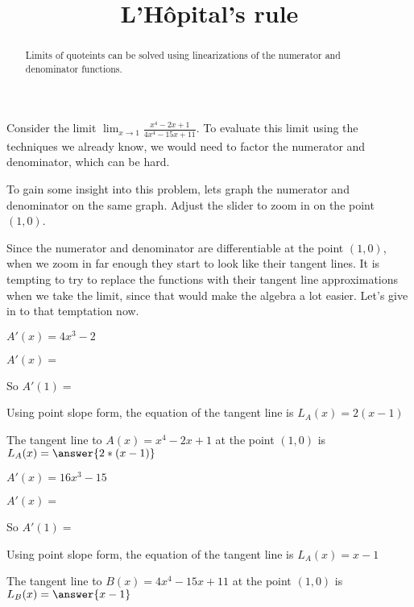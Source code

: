 \documentclass{ximera}
\title[Break-Ground:]{L'H\^{o}pital's rule}
\begin{document}
\begin{abstract}
   Limits of quoteints can be solved using linearizations of the numerator and denominator functions.
\end{abstract}

Consider the limit \(\displaystyle\lim_{x \to 1} \frac{x^4-2x+1}{4x^4 - 15x +11}\).  To evaluate this limit using the 
techniques we already know, we would need to factor the numerator and denominator, which can be hard.

To gain some insight into this problem, lets graph the numerator and denominator on the same graph. Adjust the slider
to zoom in on the point $(1,0)$.


Since the numerator and denominator are differentiable at the point $(1,0)$, 
when we zoom in far enough they start to look like their tangent lines.  It is tempting to try to replace the functions
with their tangent line approximations when we take the limit, since that would make the algebra a lot easier.  Let's
give in to that temptation now.

\begin{question}
  \begin{hint}
    \begin{question}
      \begin{hint}
        $A'(x) = 4x^3-2$
      \end{hint}
      $A'(x)=$
    \end{question}
  \end{hint}
  \begin{hint}
    So $A'(1)=$
  \end{hint}
  \begin{hint}
    Using point slope form, the equation of the tangent line is $L_A(x) = 2(x-1)$
  \end{hint}
  
  The tangent line to $A(x) = x^4-2x+1$ at the point $(1,0)$ is $L_A(x) =\answer{2*(x-1)}$
\end{question}

\begin{question}
\begin{hint}
    \begin{question}
      \begin{hint}
        $A'(x) = 16x^3-15$
      \end{hint}
      $A'(x)=$
    \end{question}
  \end{hint}
  \begin{hint}
    So $A'(1)=$
  \end{hint}
  \begin{hint}
    Using point slope form, the equation of the tangent line is $L_A(x) = x-1$
  \end{hint}
  The tangent line to $B(x) = 4x^4-15x+11$ at the point $(1,0)$ is $ L_B(x)= \answer{x-1}$
\end{question}
\end{document}
